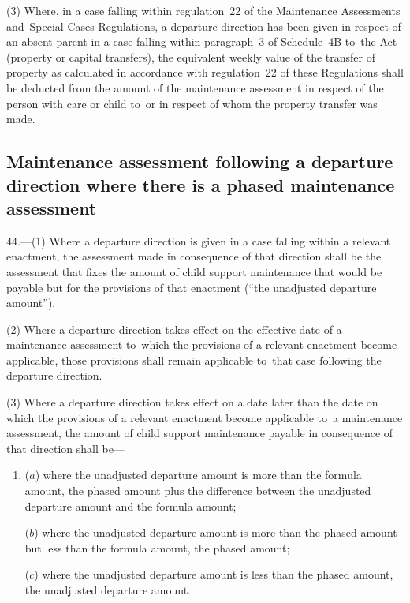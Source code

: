 \documentclass[12pt,a4paper]{article}
\begin{document}
(3) Where, in a case falling within regulation~22 of the Maintenance Assessments
and~Special Cases Regulations, a departure direction has been given in respect
of an absent parent in a case falling within paragraph~3 of Schedule~4B to~the
Act (property or capital transfers), the equivalent weekly value of the transfer
of property as calculated in accordance with regulation~22 of these Regulations
shall be deducted from the amount of the maintenance assessment in respect of
the person with care or child to~or in respect of whom the property transfer was
made.


\subsection[44. Maintenance assessment following a departure direction where there is a phased
maintenance assessment]{\sloppy Maintenance assessment following a departure direction where there is a phased
maintenance assessment}

44.—(1) Where a departure direction is given in a case
falling within a relevant enactment, the assessment made in consequence of that
direction shall be the assessment that fixes the amount of child support
maintenance that would be payable but for the provisions of that enactment (“the
unadjusted departure amount”).

(2) Where a departure direction takes effect on the effective date of a
maintenance assessment to~which the provisions of a relevant enactment become
applicable, those provisions shall remain applicable to~that case following the
departure direction.

(3) Where a departure direction takes effect on a date later than the date on
which the provisions of a relevant enactment become applicable to~a maintenance
assessment, the amount of child support maintenance payable in consequence of
that direction shall be—
\begin{enumerate}\item[]
($a$) where the unadjusted departure amount is more than the formula amount, the
phased amount plus the difference between the unadjusted departure amount and
the formula amount;

($b$) where the unadjusted departure amount is more than the phased amount but less
than the formula amount, the phased amount;

($c$) where the unadjusted departure amount is less than the phased amount, the
unadjusted departure amount.
\end{enumerate}
\end{document}
